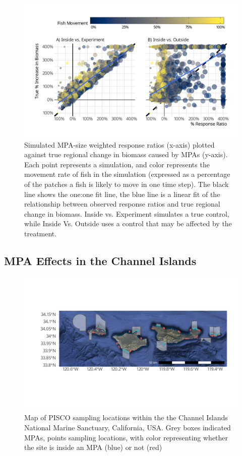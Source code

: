 \documentclass[9pt,twocolumn,twoside,lineno]{pnas-new}
\begin{document}
\begin{figure}%
  \centering
  \includegraphics[width=.9\linewidth]{figs/density-ratio.pdf}
  \caption{Simulated MPA-size weighted response ratios (x-axis) plotted against true regional change in biomass caused by MPAs (y-axis). Each point represents a simulation, and color represents the movement rate of fish in the simulation (expressed as a percentage of the patches a fish is likely to move in one time step). The black line shows the one:one fit line, the blue line is a linear fit of the relationship between observed response ratios and true regional change in biomass. Inside vs. Experiment simulates a true control, while Inside Vs. Outside uses a control that may be affected by the treatment.}
  \label{density-ratio}
\end{figure}

\hypertarget{estimating}{%
\subsection*{MPA Effects in the Channel Islands}\label{estimating}}

\begin{figure}%
  \centering
  \includegraphics[width=1\linewidth]{figs/channel-islands.pdf}
  \caption{Map of PISCO sampling locations within the the Channel Islands National Marine Sanctuary, California, USA. Grey boxes indicated MPAs, points sampling locations, with color representing whether the site is inside an MPA (blue) or not (red)}
  \label{channel-islands}
\end{figure}
\end{document}
